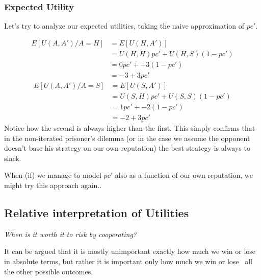 \documentclass[10pt,fleqn]{article}
\begin{document}
\subsubsection{Expected Utility}

Let's try to analyze our expected utilities, taking the naive approximation of
$pc'$.

\begin{align*}
  E[U(A, A') / A = H] &= E[U(H, A')] \\
                      &= U(H, H) pc' + U(H, S) (1-pc')\\
                      &= 0 pc' + -3 (1-pc') \\
                      &= -3 + 3 pc'
\end{align*}
\begin{align*}
  E[U(A, A') / A = S] &= E[U(S, A')] \\
                      &= U(S, H) pc' + U(S, S) (1-pc') \\
                      &= 1 pc' + -2 (1-pc') \\
                      &= -2 + 3 pc'
\end{align*}
Notice how the second is always higher than the first. This simply confirms that
in the non-iterated prisoner's dilemma (or in the case we assume the opponent
doesn't base his strategy on our own reputation) the best strategy is always to
slack.

When (if) we manage to model $pc'$ also as a function of our own reputation, we
might try this approach again..

\subsection{Relative interpretation of Utilities}
\emph{When is it worth it to risk by cooperating?}

It can be argued that it is mostly unimportant exactly how much we win or lose
in absolute terms, but rather it is important only how much we win or lose \wrt\
all the other possible outcomes.
\end{document}
